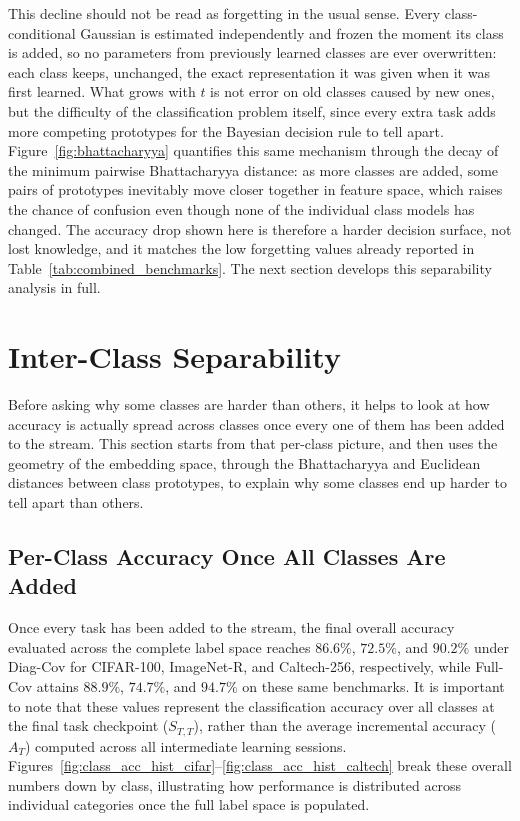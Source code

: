 This decline should not be read as forgetting in the usual sense. Every class-conditional Gaussian is estimated independently and frozen the moment its class is added, so no parameters from previously learned classes are ever overwritten: each class keeps, unchanged, the exact representation it was given when it was first learned. What grows with $t$ is not error on old classes caused by new ones, but the difficulty of the classification problem itself, since every extra task adds more competing prototypes for the Bayesian decision rule to tell apart. Figure~\ref{fig:bhattacharyya} quantifies this same mechanism through the decay of the minimum pairwise Bhattacharyya distance: as more classes are added, some pairs of prototypes inevitably move closer together in feature space, which raises the chance of confusion even though none of the individual class models has changed. The accuracy drop shown here is therefore a harder decision surface, not lost knowledge, and it matches the low forgetting values already reported in Table~\ref{tab:combined_benchmarks}. The next section develops this separability analysis in full.

\section{Inter-Class Separability}
\label{sec:interclass_results}

Before asking why some classes are harder than others, it helps to look at how accuracy is actually spread across classes once every one of them has been added to the stream. This section starts from that per-class picture, and then uses the geometry of the embedding space, through the Bhattacharyya and Euclidean distances between class prototypes, to explain why some classes end up harder to tell apart than others.

\subsection{Per-Class Accuracy Once All Classes Are Added}
\label{sec:an:recall_distributions}

Once every task has been added to the stream, the final overall accuracy evaluated across the complete label space reaches $86.6\%$, $72.5\%$, and $90.2\%$ under Diag-Cov for CIFAR-100, ImageNet-R, and Caltech-256, respectively, while Full-Cov attains $88.9\%$, $74.7\%$, and $94.7\%$ on these same benchmarks. It is important to note that these values represent the classification accuracy over all classes at the final task checkpoint ($S_{T,T}$), rather than the average incremental accuracy ($A_T$) computed across all intermediate learning sessions. Figures~\ref{fig:class_acc_hist_cifar}--\ref{fig:class_acc_hist_caltech} break these overall numbers down by class, illustrating how performance is distributed across individual categories once the full label space is populated.

